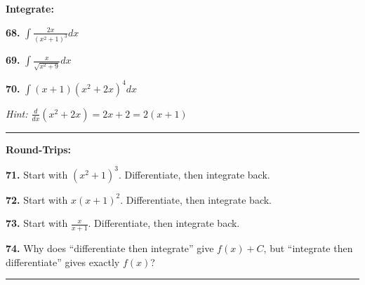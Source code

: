 \documentclass[
  11pt,
]{article}
\begin{document}
\textbf{Integrate:}

\textbf{68.} \(\int \frac{2x}{(x^2 + 1)^3} dx\)

\textbf{69.} \(\int \frac{x}{\sqrt{x^2 + 9}} dx\)

\textbf{70.} \(\int (x+1)(x^2 + 2x)^4 dx\)

\emph{Hint: \(\frac{d}{dx}(x^2 + 2x) = 2x + 2 = 2(x + 1)\)}

\begin{center}\rule{0.5\linewidth}{0.5pt}\end{center}

\textbf{Round-Trips:}

\textbf{71.} Start with \((x^2 + 1)^3\). Differentiate, then integrate
back.

\textbf{72.} Start with \(x(x + 1)^2\). Differentiate, then integrate
back.

\textbf{73.} Start with \(\frac{x}{x+1}\). Differentiate, then integrate
back.

\textbf{74.} Why does ``differentiate then integrate'' give
\(f(x) + C\), but ``integrate then differentiate'' gives exactly
\(f(x)\)?

\begin{center}\rule{0.5\linewidth}{0.5pt}\end{center}
\end{document}
